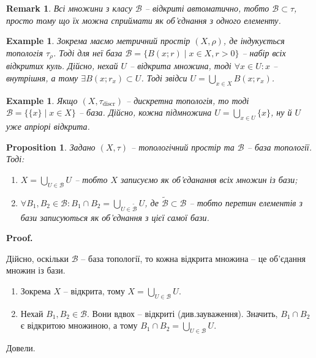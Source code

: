 \documentclass[a4paper, 10pt]{article}
\makeatletter
\theoremstyle{theoremdd}
\newtheorem{example}[theorem]{Example}
\newtheorem{proposition}[theorem]{Proposition}
\newtheorem{remark}[theorem]{Remark}
\renewenvironment{proof}[1][Proof.\\]{\par
\pushQED{\hfill \qed}%
\normalfont \topsep6\p@\@plus6\p@\relax
\trivlist
\item\relax
{\bfseries
#1\@addpunct{.}}\hspace\labelsep\ignorespaces
}{%
\popQED\endtrivlist\@endpefalse
}
\makeatother
\begin{document}
\begin{remark}
Всі множини з класу $\mathcal{B}$ -- відкриті автоматично, тобто $\mathcal{B} \subset \tau$, просто тому що їх можна сприймати як об'єднання з одного елементу.
\end{remark}

\begin{example}
Зокрема маємо метричний простір $(X,\rho)$, де індукується топологія $\tau_\rho$. Тоді для неї база $\mathcal{B} = \{ B(x;r) \mid x \in X, r > 0 \}$ -- набір всіх відкритих куль. Дійсно, нехай $U$ -- відкрита множина, тоді $\forall x \in U: x$ -- внутрішня, а тому $\exists B(x;r_x) \subset U$. Тоді звідси $U = \displaystyle\bigcup_{x \in X} B(x;r_x)$. 
\end{example}

\begin{example}
Якщо $(X,\tau_{\text{discr}})$ -- дискретна топологія, то тоді $\mathcal{B} = \{\{x\} \mid x \in X\}$ -- база. Дійсно, кожна підмножина $U = \displaystyle\bigcup_{x \in U} \{x\}$, ну й $U$ уже апріорі відкрита.
\end{example}

\begin{proposition}
Задано $(X,\tau)$ -- топологічний простір та $\mathcal{B}$ -- база топології. Тоді:
\begin{enumerate}[nosep,wide=0pt,label={\arabic*)}]
\item $X = \displaystyle\bigcup_{U \in \mathcal{B}} U$ -- тобто $X$ записуємо як об'єданання всіх множин із бази;
\item $\forall B_1,B_2 \in \mathcal{B}: B_1 \cap B_2 = \displaystyle\bigcup_{U \in \mathcal{\tilde{B}}} U$, де $\mathcal{\tilde{B}} \subset \mathcal{B}$ -- тобто перетин елементів з бази записуються як об'єднання з цієї самої бази.
\end{enumerate}
\end{proposition}

\begin{proof}
Дійсно, оскільки $\mathcal{B}$ -- база топології, то кожна відкрита множина -- це об'єдання множин із бази.
\begin{enumerate}[nosep,wide=0pt,label={\arabic*)}]
\item Зокрема $X$ -- відкрита, тому $X = \displaystyle\bigcup_{U \in \mathcal{B}} U$.
\item Нехай $B_1,B_2 \in \mathcal{B}$. Вони вдвох -- відкриті (див.\@ зауваження). Значить, $B_1 \cap B_2$ є відкритою множиною, а тому $B_1 \cap B_2 = \displaystyle\bigcup_{U \in \mathcal{B}} U$.
\end{enumerate}
Довели.
\end{proof}
\end{document}
